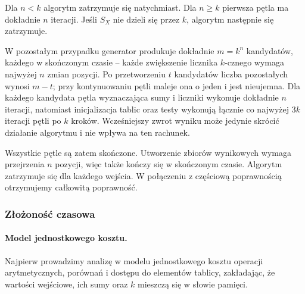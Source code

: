 \documentclass[11pt]{article}
\begin{document}
Dla \(n<k\) algorytm zatrzymuje się natychmiast. Dla \(n\geq k\) pierwsza pętla ma dokładnie \(n\) iteracji. Jeśli \(S_X\) nie dzieli się przez \(k\), algorytm następnie się zatrzymuje.

W pozostałym przypadku generator produkuje dokładnie \(m=k^n\) kandydatów, każdego w skończonym czasie -- każde zwiększenie licznika \(k\)-cznego wymaga najwyżej \(n\) zmian pozycji. Po przetworzeniu \(t\) kandydatów liczba pozostałych wynosi \(m-t\); przy kontynuowaniu pętli maleje ona o jeden i jest nieujemna. Dla każdego kandydata pętla wyznaczająca sumy i liczniki wykonuje dokładnie \(n\) iteracji, natomiast inicjalizacja tablic oraz testy wykonują łącznie co najwyżej \(3k\) iteracji pętli po \(k\) kroków. Wcześniejszy zwrot wyniku może jedynie skrócić działanie algorytmu i nie wpływa na ten rachunek.

Wszystkie pętle są zatem skończone. Utworzenie zbiorów wynikowych wymaga przejrzenia \(n\) pozycji, więc także kończy się w skończonym czasie. Algorytm zatrzymuje się dla każdego wejścia. W połączeniu z częściową poprawnością otrzymujemy całkowitą poprawność.

\subsubsection{Złożoność czasowa}

\paragraph{Model jednostkowego kosztu.}

Najpierw prowadzimy analizę w modelu jednostkowego kosztu operacji arytmetycznych, porównań i dostępu do elementów tablicy, zakładając, że wartości wejściowe, ich sumy oraz \(k\) mieszczą się w słowie pamięci.
\end{document}
